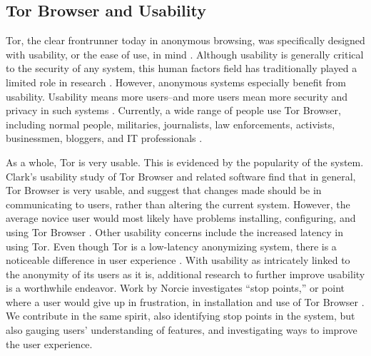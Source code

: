 \subsection{Tor Browser and Usability}

Tor, the clear frontrunner today in anonymous browsing, was specifically designed with usability, or the ease of use, in mind \cite{tor_wikipedia_2015, dingledine2004tor}. Although usability is generally critical to the security of any system, this human factors field has traditionally played a limited role in research \cite{cranor2005security}. However, anonymous systems especially benefit from usability. Usability means more users--and more users mean more security and privacy in such systems \cite{dingledine2006anonymity}. Currently, a wide range of people use Tor Browser, including normal people, militaries, journalists, law enforcements, activists, businessmen, bloggers, and IT professionals \cite{torproject_2015}. 

As a whole, Tor is very usable. This is evidenced by the popularity of the system. Clark's usability study of Tor Browser and related software find that in general, Tor Browser is very usable, and suggest that changes made should be in communicating to users, rather than altering the current system. However, the average novice user would most likely have problems installing, configuring, and using Tor Browser \cite{clark2007usability}. Other usability concerns include the increased latency in using Tor. Even though Tor is a low-latency anonymizing system, there is a noticeable difference in user experience \cite{fabian2010privately}. With usability as intricately linked to the anonymity of its users as it is, additional research to further improve usability is a worthwhile endeavor. Work by Norcie investigates ``stop points,'' or point where a user would give up in frustration, in installation and use of Tor Browser \cite{norcie2012eliminating}. We contribute in the same spirit, also identifying stop points in the system, but also gauging users' understanding of features, and investigating ways to improve the user experience. 